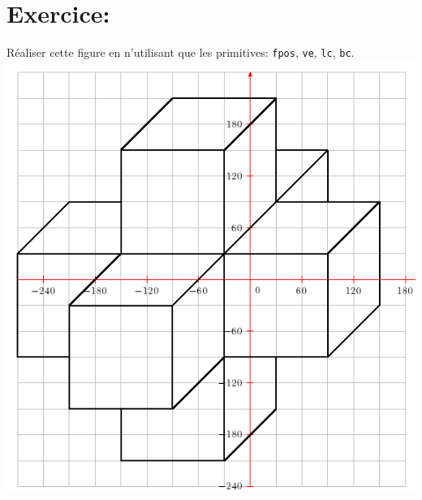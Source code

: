 \section{Exercice:}
\noindent
Réaliser cette figure en n'utilisant que les primitives: \texttt{fpos}, \texttt{ve}, \texttt{lc}, \texttt{bc}.\\
\includegraphics[scale=0.7]{images/fpos-cube.png}
